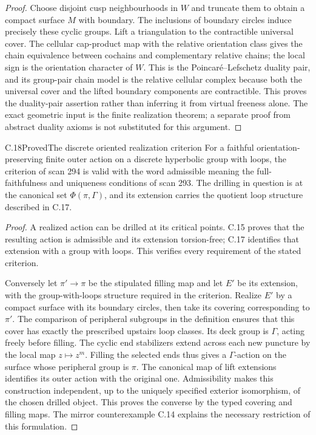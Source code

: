 \begin{proof}
Choose disjoint cusp neighbourhoods in $W$ and truncate them to obtain
a compact surface $M$ with boundary. The inclusions of boundary circles
induce precisely these cyclic groups. Lift a triangulation to the
contractible universal cover. The cellular cap-product map with the
relative orientation class gives the chain equivalence between
cochains and complementary relative chains; the local sign is the
orientation character of $W$. This is the Poincar\'e--Lefschetz duality
pair, and its group-pair chain model is the relative cellular complex
because both the universal cover and the lifted boundary components
are contractible. This proves the duality-pair assertion rather than
inferring it from virtual freeness alone. The exact geometric input is
the finite realization theorem; a separate proof from abstract duality
axioms is not substituted for this argument.
\end{proof}

\begin{claim}{C.18}{Proved}{The discrete oriented realization criterion}
For a faithful orientation-preserving finite outer action on a discrete
hyperbolic group with loops, the criterion of scan 294 is valid with
the word admissible meaning the full-faithfulness and uniqueness
conditions of scan 293. The drilling in question is at the canonical
set $\Phi(\pi,\Gamma)$, and its extension carries the quotient loop
structure described in C.17.
\end{claim}
\begin{proof}
A realized action can be drilled at its critical points. C.15 proves
that the resulting action is admissible and its extension torsion-free;
C.17 identifies that extension with a group with loops. This verifies
every requirement of the stated criterion.

Conversely let $\pi'\to\pi$ be the stipulated filling map and let
$E'$ be its extension, with the group-with-loops structure required in
the criterion. Realize $E'$ by a compact surface with its boundary
circles, then take its covering corresponding to $\pi'$. The comparison
of peripheral subgroups in the definition ensures that this cover has
exactly the prescribed upstairs loop classes. Its deck group is
$\Gamma$, acting freely before filling. The cyclic end stabilizers
extend across each new puncture by the local map $z\mapsto z^m$.
Filling the selected ends thus gives a $\Gamma$-action on the surface
whose peripheral group is $\pi$. The canonical map of lift extensions
identifies its outer action with the original one. Admissibility makes
this construction independent, up to the uniquely specified exterior
isomorphism, of the chosen drilled object. This proves the converse
by the typed covering and filling maps. The mirror counterexample
C.14 explains the necessary restriction of this formulation.
\end{proof}

